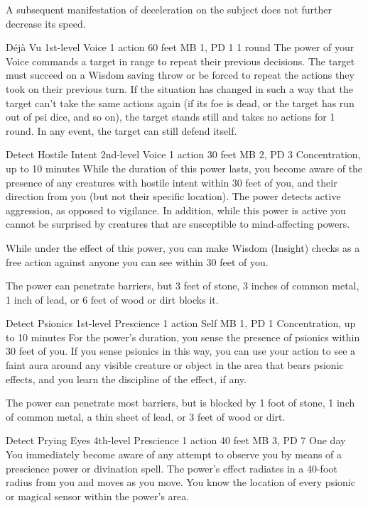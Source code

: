 A subsequent manifestation of deceleration on the subject
does not further decrease its speed.

\DndPowerHeader%
  {Déjà Vu}
  {1st-level Voice}
  {1 action}
  {60 feet}
  {MB 1, PD 1}
  {1 round}
The power of your Voice commands a target in range
to repeat their previous decisions.
The target must succeed on a Wisdom saving throw
or be forced to repeat the actions they took on their previous turn.
If the situation has changed in such a way that the target
can't take the same actions again
(if its foe is dead, or the target has run out of psi dice, and so on),
the target stands still and takes no actions for 1 round.
In any event, the target can still defend itself.

\DndPowerHeader%
  {Detect Hostile Intent}
  {2nd-level Voice}
  {1 action}
  {30 feet}
  {MB 2, PD 3}
  {Concentration, up to 10 minutes}
  While the duration of this power lasts,
  you become aware of the presence of any creatures with hostile intent
  within 30 feet of you,
  and their direction from you
  (but not their specific location).
  The power detects active aggression,
  as opposed to vigilance.
  In addition, while this power is active you cannot be surprised
  by creatures that are susceptible to mind-affecting powers.

  While under the effect of this power,
  you can make Wisdom (Insight) checks as a free action
  against anyone you can see within 30 feet of you.
  
  The power can penetrate barriers, but 3 feet of stone,
  3 inches of common metal,
  1 inch of lead,
  or 6 feet of wood or dirt blocks it.

\DndPowerHeader%
  {Detect Psionics}
  {1st-level Prescience}
  {1 action}
  {Self}
  {MB 1, PD 1}
  {Concentration, up to 10 minutes}
For the power's duration,
you sense the presence of psionics within 30 feet of you.
If you sense psionics in this way,
you can use your action to see a faint aura around
any visible creature or object in the area that bears psionic effects,
and you learn the discipline of the effect, if any.

The power can penetrate most barriers, but is blocked by
1 foot of stone,
1 inch of common metal,
a thin sheet of lead,
or 3 feet of wood or dirt.

\DndPowerHeader%
  {Detect Prying Eyes}
  {4th-level Prescience}
  {1 action}
  {40 feet}
  {MB 3, PD 7}
  {One day}
  You immediately become aware of any attempt to observe you
  by means of a prescience power or divination spell.
  The power's effect radiates in a 40-foot radius
  from you and moves as you move.
  You know the location of every psionic or magical sensor
  within the power's area.

